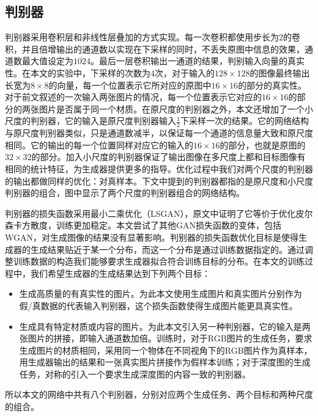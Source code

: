 \documentclass[UTF8,openany,AutoFakeBold,AutoFakeSlant,cs4size]{ctexbook}
\begin{document}
\subsection{判别器}

判别器采用卷积层和非线性层叠加的方式实现。每一次卷积都使用步长为$2$的卷积，并且倍增输出的通道数以实现在下采样的同时，不丢失原图中信息的效果，通道数最大值设定为$1024$。最后一层卷积输出一通道的结果，判别输入向量的真实性。在本文的实验中，下采样的次数为$4$次，对于输入的$128 \times 128$的图像最终输出长宽为$8\times8$的向量，每一个位置表示它所对应的原图中$16\times16$的部分的真实性。对于前文叙述的一次输入两张图片的情况，每一个位置表示它对应的$16\times16$的部分的两张图片是否属于同一个材质。在原尺度的判别器之外，本文还增加了一个小尺度的判别器，它的输入是原尺度判别器输入$\frac{1}{2}$下采样一次的结果。它的网络结构与原尺度判别器类似，只是通道数减半，以保证每一个通道的信息量大致和原尺度相同。它的输出的每一个位置同样对应它的输入的$16\times16$的部分，也就是原图的$32\times32$的部分。加入小尺度的判别器保证了输出图像在多尺度上都和目标图像有相同的统计特征，为生成器提供更多的指导。优化过程中我们对两个尺度的判别器的输出都做同样的优化：对真样本。下文中提到的判别器都指的是原尺度和小尺度判别器的组合，图中显示了两个尺度的判别器组合的网络结构。

判别器的损失函数采用最小二乘优化（LSGAN），原文中证明了它等价于优化皮尔森卡方散度，训练更加稳定。本文尝试了其他GAN损失函数的变体，包括WGAN，对生成图像的结果没有显著影响。判别器的损失函数优化目标是使得生成器的生成结果贴近于某一个分布，而这一个分布是通过训练数据指定的。通过调整训练数据的构造我们能够要求生成器拟合符合训练目标的分布。在本文的训练过程中，我们希望生成器的生成结果达到下列两个目标：

\begin{itemize}
	\item 生成高质量的有真实性的图片。为此本文使用生成图片和真实图片分别作为假/真数据的代表输入判别器，这个损失函数使得生成图片能更具真实性。
	\item 生成具有特定材质或内容的图片。为此本文引入另一种判别器，它的输入是两张图片的拼接，即输入通道数加倍。训练时，对于RGB图片的生成任务，要求生成图片的材质相同，采用同一个物体在不同视角下的RGB图片作为真样本，用生成器输出的结果和一张真实图片拼接作为假样本训练；对于深度图的生成任务，对称的引入一个要求生成深度图的内容一致的判别器。
\end{itemize}

所以本文的网络中共有八个判别器，分别对应两个生成任务、两个目标和两种尺度的组合。
\end{document}
